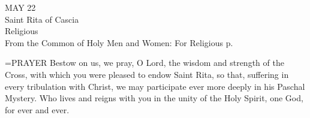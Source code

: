 \begin{center}\normalsize MAY 22\\
\footnotesize Saint Rita of Cascia\\
\footnotesize Religious\\
\footnotesize From the Common of Holy Men and Women: For Religious p. \\
\end{center}

\hangindent=\parindent \small{PRAYER 
Bestow on us, we pray, O Lord,
the wisdom and strength of the Cross,
with which you were pleased to endow Saint Rita,
so that, suffering in every tribulation with Christ,
we may participate ever more deeply in his Paschal Mystery.
Who lives and reigns with you in the unity of the Holy Spirit,
one God, for ever and ever.\\}
 
